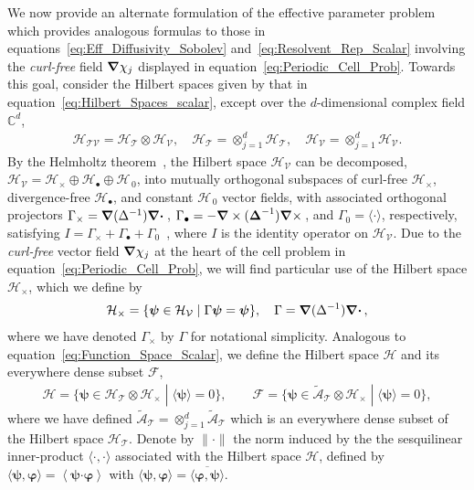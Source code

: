 \documentclass[leqno,onefignum,onetabnum]{siamltex1213}
\newcommand{\Tc}{\mathcal{T}}
\newcommand{\Vc}{\mathcal{V}}
\newcommand{\Hc}{\mathcal{H}}
\newcommand{\Fc}{\mathcal{F}}
\newcommand{\Ac}{\mathcal{A}}
\newcommand{\Hs}{\mathscr{H}}
\newcommand{\As}{\mathscr{A}}
\newcommand\bDelta{\mbox{\boldmath${\Delta}$}}
\newcommand\bnabla{\mbox{\boldmath${\nabla}$}}
\providecommand\bcdot{\boldsymbol{\cdot}}
\newcommand{\vecpsi}{\boldsymbol{\psi}}
\newcommand{\vecvarphi}{\boldsymbol{\varphi}}
\begin{document}
We now provide an alternate formulation of the effective parameter
problem~\cite{Avellaneda:PRL-753,Avellaneda:CMP-339} which provides
analogous formulas to those in
equations~\eqref{eq:Eff_Diffusivity_Sobolev}
and~\eqref{eq:Resolvent_Rep_Scalar} involving the \emph{curl-free}
field $\bnabla\chi_j$ displayed in
equation~\eqref{eq:Periodic_Cell_Prob}. Towards this goal, consider 
the Hilbert spaces given by that in
equation~\eqref{eq:Hilbert_Spaces_scalar}, except over the
$d$-dimensional complex field $\mathbb{C}^d$,
%
\begin{align}\label{eq:Hilbert_Spaces_vector}
  \Hc_{\Tc\Vc}=\Hc_{\Tc}\otimes\Hc_{\Vc}, \quad
  \Hc_{\Tc}=\otimes_{j=1}^d\Hs_{\Tc}, \quad
  \Hc_{\Vc}=\otimes_{j=1}^d\Hs_{\Vc}.
\end{align}
%
By the Helmholtz theorem~\cite{Denaro:2003:0271,Bhatia:IEE:1077}, the
Hilbert space $\Hc_{\Vc}$ can be decomposed,
$\Hc_{\Vc}=\Hc_\times\oplus\Hc_\bullet\oplus\Hc_{\,0}$, into mutually orthogonal
subspaces of curl-free $\Hc_\times$, divergence-free $\Hc_\bullet$, and constant
$\Hc_{\,0}$ vector fields, with associated orthogonal projectors
$\Gamma_\times=\bnabla (\Delta^{-1})\bnabla \bcdot\,$, $\Gamma_\bullet=-\bnabla
\times(\bDelta^{-1})\bnabla \times\,$, and $\Gamma_0=\langle\cdot\rangle$,
respectively, satisfying
$I=\Gamma_\times+\Gamma_\bullet+\Gamma_0$~\cite{Fannjiang:SIAM_JAM:333,MILTON:2002:TC}, where
$I$ is the identity operator on $\Hc_{\Vc}$.
Due to the \emph{curl-free} vector field $\bnabla\chi_j$ at the heart of
the cell problem in equation~\eqref{eq:Periodic_Cell_Prob}, we will
find particular use of the Hilbert space $\Hc_\times$, which we define by
%
\begin{align}\label{eq:Hilbert_Curl_Free}
  \Hc_\times=\{\vecpsi\in\Hc_{\Vc} \; | \; \Gamma\vecpsi=\vecpsi\},
  \quad
  \Gamma=\bnabla (\Delta^{-1})\bnabla \bcdot\,,
\end{align}
%
where we have denoted $\Gamma_\times$ by $\Gamma$ for notational simplicity. 
Analogous to equation~\eqref{eq:Function_Space_Scalar},
we define the Hilbert space $\Hc$ and its everywhere dense subset
$\Fc$, 
%
\begin{align}\label{eq:Function_Space_Vector} 
  \Hc=\{\vecpsi\in\Hc_{\Tc}\otimes\Hc_\times \; | \; \langle \vecpsi\rangle=0\}, \qquad
  \Fc=\{\vecpsi\in\tilde{\Ac}_{\Tc}\otimes\Hc_\times \; | \; \langle \vecpsi\rangle=0\},
\end{align}
%
where we have defined $\tilde{\Ac}_{\Tc}=\otimes_{j=1}^d\tilde{\As}_{\Tc}$
which is an everywhere dense subset of the Hilbert space
$\Hc_{\Tc}$. Denote by $\|\cdot\|$ the norm induced by the the sesquilinear
inner-product $\langle\cdot,\cdot\rangle$ associated with the Hilbert space $\Hc$, defined
by $\langle\vecpsi,\vecvarphi\rangle=\left\langle\vecpsi\bcdot\vecvarphi \right\rangle$
with $\langle\vecpsi,\vecvarphi\rangle=\overline{\langle\vecvarphi,\vecpsi\rangle}$. 
\end{document}
